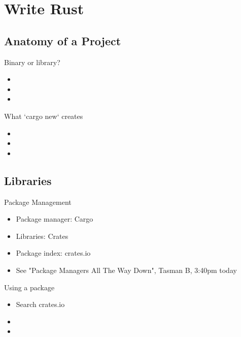\documentclass[xcolor={svgnames},hyperref]{beamer}
\begin{document}
\section{Write Rust}

\subsection{Anatomy of a Project}

    \begin{frame}
        Binary or library?
        \begin{itemize}
            \item
            \item
            \item
        \end{itemize}
    \end{frame}

    \begin{frame}
        What `cargo new` creates
        \begin{itemize}
            \item
            \item
            \item
        \end{itemize}
    \end{frame}


\subsection{Libraries }

    \begin{frame}
        Package Management
        \begin{itemize}
            \item Package manager: Cargo
            \item Libraries: Crates
            \item Package index: crates.io
            \item See "Package Managers All The Way Down", Tasman B, 3:40pm today
        \end{itemize}
    \end{frame}

    \begin{frame}
        Using a package
        \begin{itemize}
            \item Search crates.io
            \item
            \item
        \end{itemize}
    \end{frame}
\end{document}
